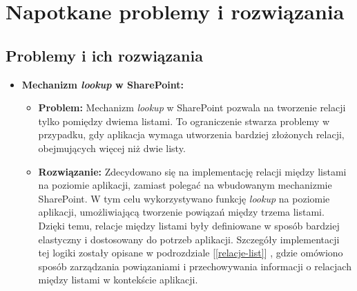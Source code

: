\chapter{Napotkane problemy i rozwiązania}

\section*{Problemy i ich rozwiązania}

\begin{itemize}
    \item \textbf{Mechanizm \emph{lookup} w SharePoint:}
          \begin{itemize}
              \item \textbf{Problem:} Mechanizm \emph{lookup} w SharePoint pozwala na tworzenie relacji tylko pomiędzy dwiema listami. To ograniczenie stwarza problemy w przypadku, gdy aplikacja wymaga utworzenia bardziej złożonych relacji, obejmujących więcej niż dwie listy.
              \item \textbf{Rozwiązanie:} Zdecydowano się na implementację relacji między listami na poziomie aplikacji, zamiast polegać na wbudowanym mechanizmie SharePoint. W tym celu wykorzystywano funkcję \emph{lookup} na poziomie aplikacji, umożliwiającą tworzenie powiązań między trzema listami. Dzięki temu, relacje między listami były definiowane w sposób bardziej elastyczny i dostosowany do potrzeb aplikacji. Szczegóły implementacji tej logiki zostały opisane w podrozdziale [\ref{relacje-list}] , gdzie omówiono sposób zarządzania powiązaniami i przechowywania informacji o relacjach między listami w kontekście aplikacji.
          \end{itemize}


\end{itemize}
